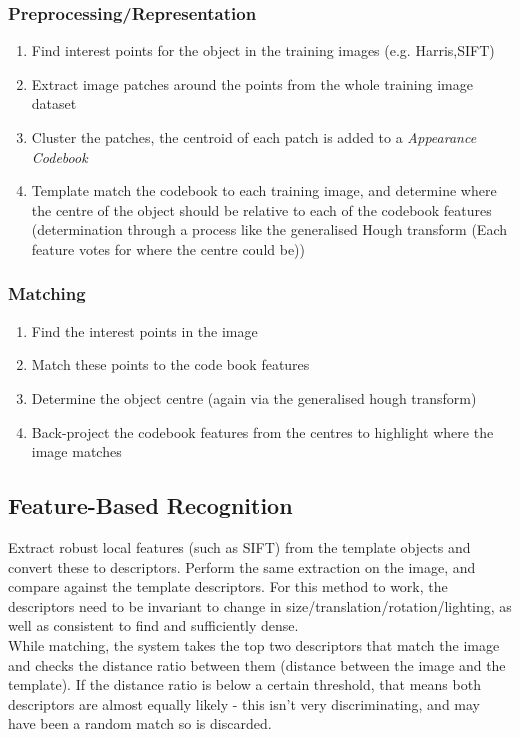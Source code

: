 \subsubsection{Preprocessing/Representation}
\begin{enumerate}
    \item Find interest points for the object in the training images (e.g. Harris,SIFT)
    \item Extract image patches around the points from the whole training image dataset
    \item Cluster the patches, the centroid of each patch is added to a \emph{Appearance Codebook}
    \item Template match the codebook to each training image, and determine where the centre of the object should be relative to each of the codebook features (determination through a process like the generalised Hough transform (Each feature votes for where the centre could be))
\end{enumerate}

\subsubsection{Matching}
\begin{enumerate}
    \item Find the interest points in the image
    \item Match these points to the code book features
    \item Determine the object centre (again via the generalised hough transform)
    \item Back-project the codebook features from the centres to highlight where the image matches
\end{enumerate}

\subsection{Feature-Based Recognition}
Extract robust local features (such as SIFT) from the template objects and convert these to descriptors. Perform the same extraction on the image, and compare against the template descriptors. For this method to work, the descriptors need to be invariant to change in size/translation/rotation/lighting, as well as consistent to find and sufficiently dense. \\

While matching, the system takes the top two descriptors that match the image and checks the distance ratio between them (distance between the image and the template). If the distance ratio is below a certain threshold, that means both descriptors are almost equally likely - this isn't very discriminating, and may have been a random match so is discarded.

